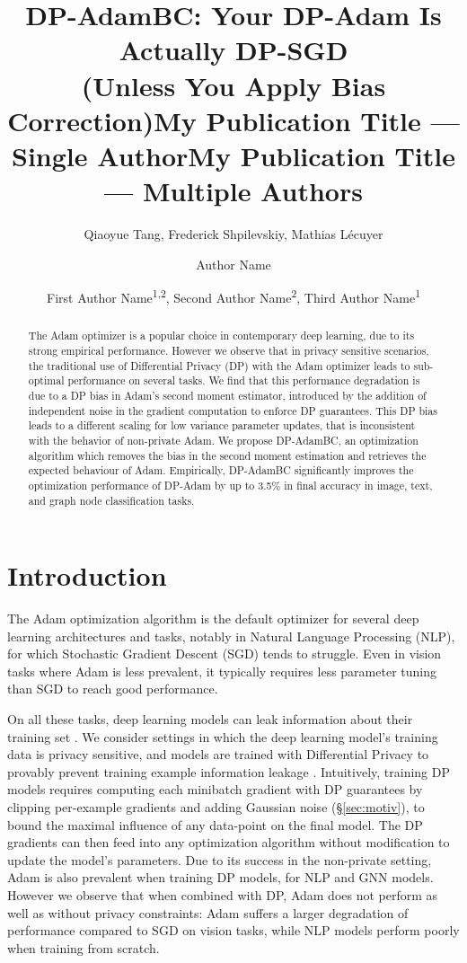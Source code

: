 \documentclass[letterpaper]{article} %
\title{DP-AdamBC: Your DP-Adam Is Actually DP-SGD \\ (Unless You Apply Bias Correction)}
\author{
    Qiaoyue Tang, Frederick Shpilevskiy, Mathias L\'ecuyer
}
\title{My Publication Title --- Single Author}
\author {
    Author Name
}
\title{My Publication Title --- Multiple Authors}
\author {
    First Author Name\textsuperscript{\rm 1,\rm 2},
    Second Author Name\textsuperscript{\rm 2},
    Third Author Name\textsuperscript{\rm 1}
}
\begin{document}
\maketitle

\begin{abstract}
    The Adam optimizer is a popular choice in contemporary deep learning, due to its strong empirical performance. However we observe that in privacy sensitive scenarios, the traditional use of Differential Privacy (DP) with the Adam optimizer leads to sub-optimal performance on several tasks. We find that this performance degradation is due to a DP bias in Adam's second moment estimator, introduced by the addition of independent noise in the gradient computation to enforce DP guarantees.
    This DP bias leads to a different scaling for low variance parameter updates, that is inconsistent with the behavior of non-private Adam. %
    We propose DP-AdamBC, an optimization algorithm which removes the bias in the second moment estimation and retrieves the expected behaviour of Adam.
    Empirically, DP-AdamBC significantly improves the optimization performance of DP-Adam by up to 3.5\% in final accuracy in image, text, and graph node classification tasks.
\end{abstract}

\section{Introduction}
\label{sec:intro}
The Adam optimization algorithm \citep{orig_adam} is the default optimizer for several deep learning architectures and tasks, notably in Natural Language Processing (NLP), for which Stochastic Gradient Descent (SGD) tends to struggle. Even in vision tasks where Adam is less prevalent, it typically requires less parameter tuning than SGD to reach good performance.

On all these tasks, deep learning models can leak information about their training set \citep{carlini2019secret,carlini2021extracting,carlini2022membership,balle2022reconstructing}.
We consider settings in which the deep learning model's training data is privacy sensitive, and models are trained with Differential Privacy \citep{dwork2006calibrating,abadi2016deep} to provably prevent training example information leakage \citep{wasserman2010statistical}.
Intuitively, training DP models requires computing each minibatch gradient with DP guarantees by clipping per-example gradients and adding Gaussian noise (\S\ref{sec:motiv}), to bound the maximal influence of any data-point on the final model.
The DP gradients can then feed into any optimization algorithm without modification to update the model's parameters.
Due to its success in the non-private setting, Adam is also prevalent when training  DP models, for NLP \citep{li2021} and GNN \citep{daigavane2022nodelevel} models.
%
However we observe that when combined with DP, Adam does not perform as well as without privacy constraints: Adam suffers a larger degradation of performance compared to SGD on vision tasks, while NLP models perform poorly when training from scratch.
\end{document}
